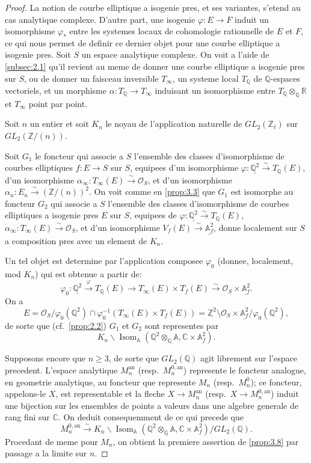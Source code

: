 \documentclass[11pt,reqno]{amsart}
\theoremstyle{plain}
\theoremstyle{remark}
\DeclareMathOperator{\Isom}{Isom}
\newcommand{\shO}{\mathcal{O}}
\newcommand{\Z}{\mathbb{Z}}
\newcommand{\Q}{\mathbb{Q}}
\newcommand{\R}{\mathbb{R}}
\newcommand{\C}{\mathbb{C}}
\newcommand{\A}{\mathbb{A}}
\newcommand{\isom}{\xrightarrow{\sim}}
\newcommand{\xto}[1]{\xrightarrow{#1}}
\numberwithin{equation}{section}
\begin{document}
\begin{proof}
La notion de courbe elliptique a isogenie pres, et ses variantes, s'etend au cas analytique complexe. D'autre part, une isogenie $\varphi: E \to F$ induit un isomorphisme $\varphi_*$ entre les systemes locaux de cohomologie rationnelle de $E$ et $F$, ce qui nous permet de definir ce dernier objet pour une courbe elliptique a isogenie pres. Soit $S$ un espace analytique complexe. On voit a l'aide de \ref{subsec:2.1} qu'il revient au meme de donner une courbe elliptique a isogenie pres sur $S$, ou de donner un faisceau inversible $T_\infty$, un systeme local $T_\Q$ de $\Q$-espaces vectoriels, et un morphisme $\alpha: T_\Q \to T_\infty$ induisant un isomorphisme entre $T_\Q \otimes_\Q \R$ et $T_\infty$ point par point.

Soit $n$ un entier et soit $K_n$ le noyau de l'application naturelle de $GL_2(\Z_\ell)$ sur $GL_2(\Z/(n))$.

Soit $G_1$ le foncteur qui associe a $S$ l'ensemble des classes d'isomorphisme de courbes elliptiques $f: E \to S$ sur $S$, equipees d'un isomorphisme $\varphi: \underline{\Q^2} \isom T_\Q(E)$, d'un isomorphisme $\alpha_\infty: T_\infty(E) \isom \shO_S$, et d'un isomorphisme $\alpha_n: E_n \isom (\Z/(n))^2$. On voit comme en \ref{prop:3.3} que $G_1$ est isomorphe au foncteur $G_2$ qui associe a $S$ l'ensemble des classes d'isomorphisme de courbes elliptiques a isogenie pres $E$ sur $S$, equipees de $\varphi: \underline{\Q^2} \isom T_\Q(E)$, $\alpha_\infty: T_\infty(E) \isom \shO_S$, et d'un isomorphisme $V_f(E) \isom \underline{\A_f^2}$, donne localement sur $S$ a composition pres avec un element de $K_n$.

Un tel objet est determine par l'application composee $\varphi_0$ (donnee, localement, mod $K_n$) qui est obtenue a partir de:
\[
\varphi_0: \underline{\Q^2} \xto{\varphi} T_\Q(E) \to T_\infty(E) \times T_f(E) \xto{\sim} \shO_S \times \underline{\A_f^2}.
\]
On a
\[
E = \shO_S / \varphi_0(\Q^2) \cap \varphi_0^{-1}(T_\infty(E) \times T_f(E)) = \underline{\Z^2} \setminus \shO_S \times \underline{\A_f^2} / \varphi_0(\Q^2),
\]
de sorte que (cf.~\ref{prop:2.2}) $G_1$ et $G_2$ sont representes par
\[
K_n \backslash \Isom_{\A}(\Q^2 \otimes_\Q \A, \C \times \A_f^2).
\]

Supposons encore que $n \geq 3$, de sorte que $GL_2(\Q)$ agit librement sur l'espace precedent. L'espace analytique $M_n^{\text{an}}$ (resp.~$M_n^{0,\text{an}}$) represente le foncteur analogue, en geometrie analytique, au foncteur que represente $M_n$ (resp.~$M_n^0$); ce foncteur, appelons-le $X$, est representable et la fleche $X \to M_n^{\text{an}}$ (resp.~$X \to M_n^{0,\text{an}}$) induit une bijection sur les ensembles de points a valeurs dans une algebre generale de rang fini sur $\C$. On deduit consequemment de ce qui precede que
\[
M_n^{0,\text{an}} \isom K_n \backslash \Isom_{\A}(\Q^2 \otimes_\Q \A, \C \times \A_f^2) / GL_2(\Q).
\]
Procedant de meme pour $M_n$, on obtient la premiere assertion de \ref{prop:3.8} par passage a la limite sur $n$.


\end{proof}
\end{document}
